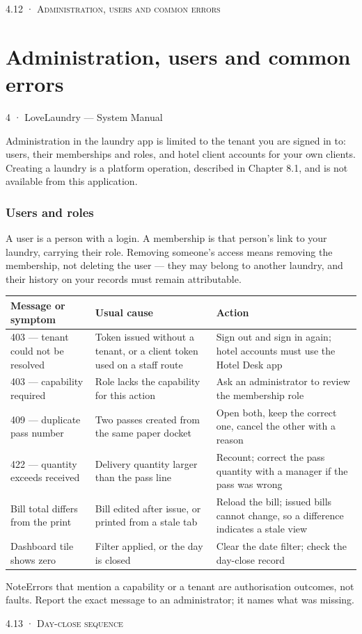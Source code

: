 \documentclass[11pt,a4paper,oneside]{book}
\begin{document}
\textsc{\small\color{crimson}4.12 · Administration, users and common errors}\par\medskip
\section*{Administration, users and common errors}
4 · LoveLaundry — System Manual

Administration in the laundry app is limited to the tenant you are signed in to: users, their memberships and roles, and hotel client accounts for your own clients. Creating a laundry is a platform operation, described in Chapter 8.1, and is not available from this application.

\subsubsection*{Users and roles}
A user is a person with a login. A membership is that person's link to your laundry, carrying their role. Removing someone's access means removing the membership, not deleting the user — they may belong to another laundry, and their history on your records must remain attributable.

\begin{center}\small
\begin{tabularx}{\linewidth}{|X|X|X|}
\hline
\rowcolor{lightgrey}
\textbf{Message or symptom} & \textbf{Usual cause} & \textbf{Action} \\ \hline
403 — tenant could not be resolved & Token issued without a tenant, or a client token used on a staff route & Sign out and sign in again; hotel accounts must use the Hotel Desk app \\ \hline
403 — capability required & Role lacks the capability for this action & Ask an administrator to review the membership role \\ \hline
409 — duplicate pass number & Two passes created from the same paper docket & Open both, keep the correct one, cancel the other with a reason \\ \hline
422 — quantity exceeds received & Delivery quantity larger than the pass line & Recount; correct the pass quantity with a manager if the pass was wrong \\ \hline
Bill total differs from the print & Bill edited after issue, or printed from a stale tab & Reload the bill; issued bills cannot change, so a difference indicates a stale view \\ \hline
Dashboard tile shows zero & Filter applied, or the day is closed & Clear the date filter; check the day-close record \\ \hline
\end{tabularx}
\end{center}
\begin{notebox}NoteErrors that mention a capability or a tenant are authorisation outcomes, not faults. Report the exact message to an administrator; it names what was missing.\end{notebox}
\textsc{\small\color{crimson}4.13 · Day-close sequence}\par\medskip
\end{document}
